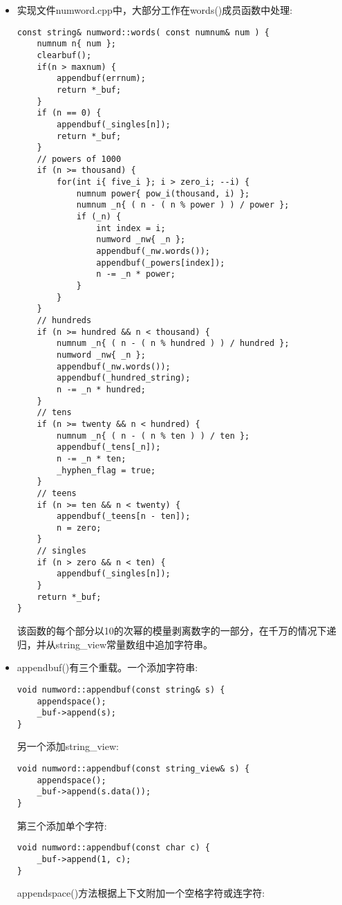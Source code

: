 \begin{itemize}
\item 
实现文件numword.cpp中，大部分工作在words()成员函数中处理:

\begin{lstlisting}[style=styleCXX]
const string& numword::words( const numnum& num ) {
	numnum n{ num };
	clearbuf();
	if(n > maxnum) {
		appendbuf(errnum);
		return *_buf;
	}
	if (n == 0) {
		appendbuf(_singles[n]);
		return *_buf;
	}
	// powers of 1000
	if (n >= thousand) {
		for(int i{ five_i }; i > zero_i; --i) {
			numnum power{ pow_i(thousand, i) };
			numnum _n{ ( n - ( n % power ) ) / power };
			if (_n) {
				int index = i;
				numword _nw{ _n };
				appendbuf(_nw.words());
				appendbuf(_powers[index]);
				n -= _n * power;
			}
		}
	}
	// hundreds
	if (n >= hundred && n < thousand) {
		numnum _n{ ( n - ( n % hundred ) ) / hundred };
		numword _nw{ _n };
		appendbuf(_nw.words());
		appendbuf(_hundred_string);
		n -= _n * hundred;
	}
	// tens
	if (n >= twenty && n < hundred) {
		numnum _n{ ( n - ( n % ten ) ) / ten };
		appendbuf(_tens[_n]);
		n -= _n * ten;
		_hyphen_flag = true;
	}
	// teens
	if (n >= ten && n < twenty) {
		appendbuf(_teens[n - ten]);
		n = zero;
	}
	// singles
	if (n > zero && n < ten) {
		appendbuf(_singles[n]);
	}
	return *_buf;
}
\end{lstlisting}

该函数的每个部分以10的次幂的模量剥离数字的一部分，在千万的情况下递归，并从string\_view常量数组中追加字符串。

\item 
appendbuf()有三个重载。一个添加字符串:

\begin{lstlisting}[style=styleCXX]
void numword::appendbuf(const string& s) {
	appendspace();
	_buf->append(s);
}
\end{lstlisting}

另一个添加string\_view:

\begin{lstlisting}[style=styleCXX]
void numword::appendbuf(const string_view& s) {
	appendspace();
	_buf->append(s.data());
}
\end{lstlisting}

第三个添加单个字符:

\begin{lstlisting}[style=styleCXX]
void numword::appendbuf(const char c) {
	_buf->append(1, c);
}
\end{lstlisting}

appendspace()方法根据上下文附加一个空格字符或连字符:


\end{itemize}
